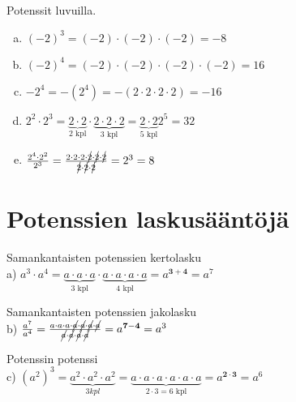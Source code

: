    
    
    
    
    \begin{esimerkki}
        Potenssit luvuilla.
        \begin{enumerate}[a)]
            \item $(-2)^3 = (-2)\cdot (-2)\cdot (-2) = -8$
            \item $(-2)^4 = (-2)\cdot (-2)\cdot (-2)\cdot (-2) = 16$
            \item $-2^4   = -(2^4) = -(2\cdot 2\cdot 2\cdot 2) = -16$
            \item $2^2\cdot 2^3 =
                \underbrace{2\cdot 2}_{\text{$2$ kpl}}\cdot \underbrace{2\cdot
                2\cdot 2}_{\text{$3$ kpl}} = \underbrace{2\cdot 2}_{\text{$5$ kpl}}2^5 = 32$
            \item $\frac{2^4\cdot 2^2}{2^3} =
                \frac{2\cdot 2\cdot 2\cdot \cancel{2} \cdot \cancel{2}\cdot
                \cancel{2}}{\cancel{2}\cdot \cancel{2}\cdot \cancel{2}} = 2^3 = 8$
        \end{enumerate}
    \end{esimerkki}
    
\section*{Potenssien laskusääntöjä}
    
    Samankantaisten potenssien kertolasku\\
    a) $a^3\cdot a^4=\underbrace{a\cdot a\cdot a}_{\text{$3$ kpl}}\cdot \underbrace{a\cdot a\cdot a\cdot a}_{\text{$4$ kpl}}=a^{\mathbf{3+4}}=a^7$
    
    Samankantaisten potenssien jakolasku\\
    b) $\frac{a^7}{a^4}=\frac{a\cdot a\cdot a\cdot \cancel{a}\cdot \cancel{a}\cdot \cancel{a}\cdot \cancel{a}}{\cancel{a}\cdot \cancel{a}\cdot \cancel{a}\cdot \cancel{a}}=a^{\mathbf{7-4}}=a^3$
    
    Potenssin potenssi\\
    c) $(a^2)^3=\underbrace{a^2\cdot a^2\cdot a^2}_{3 kpl}=\underbrace{a\cdot a\cdot a\cdot a\cdot a\cdot a}_{\text{$2\cdot 3=6$  kpl}}=a^{\mathbf{2\cdot 3}}=a^6$
    
